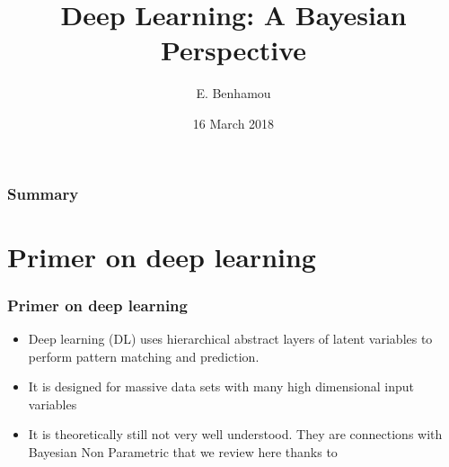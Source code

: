 \documentclass{beamer}
\title[Deep Learning: A Bayesian Perspective]{Deep Learning: A Bayesian Perspective} %
\author{
E. Benhamou\\
} %
\institute[Université Dauphine] %
{
Article Reading for Bayesian Nonparametrics\\
Julyan Arbel's course \\
M2 MASH \\
Université Paris Dauphine %
}
\date{16 March 2018} %
\begin{document}
\begin{frame}
\titlepage %
\end{frame}

\begin{frame}
\frametitle{Summary} %
\tableofcontents %
\end{frame}


\section{Primer on deep learning} 
\begin{frame}
\frametitle{Primer on deep learning}
\begin{itemize}
\item Deep learning (DL) uses hierarchical abstract layers of latent
variables to perform pattern matching and prediction.
\item It is designed for massive data sets with many high dimensional input variables
\item It is theoretically still not very well understood. They are connections with Bayesian Non Parametric that we review here thanks to \cite{Polson 2017}
\end{itemize}
\end{frame}

\end{document}
